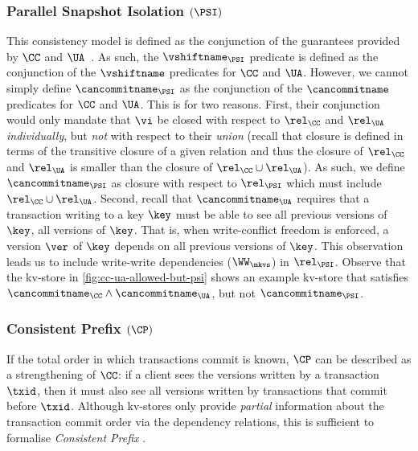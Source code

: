 \subsubsection{Parallel Snapshot Isolation \((\PSI)\)} 
This consistency model is defined as the conjunction of the guarantees provided by \(\CC\) and \(\UA\)~\cite{framework-concur}. 
As such, the \(\vshiftname_{\PSI}\) predicate is defined as the conjunction of the \(\vshiftname\) predicates for \(\CC\) and \(\UA\).
However, we cannot simply define \(\cancommitname_{\PSI}\) as the conjunction of the \(\cancommitname\) predicates for \(\CC\) and \(\UA\). 
This is for two reasons. 
First, their conjunction would only mandate that \(\vi\) be closed with respect to 
\(\rel_{\CC}\) and \(\rel_{\UA}\) \emph{individually}, but \emph{not} with respect to their \emph{union} (recall that closure is defined in terms of the transitive closure of a given relation and thus the closure of \(\rel_{\CC}\) and \(\rel_{\UA}\) is smaller than the closure of \(\rel_{\CC} \cup \rel_{\UA}\)).
As such, we define \(\cancommitname_{\PSI}\) as closure with respect to \(\rel_{\PSI}\) which must include \(\rel_{\CC} \cup \rel_{\UA}\).
Second, recall that \(\cancommitname_{\UA}\) requires that a transaction writing 
to a key \(\key\) must be able to see all previous versions of \(\key\), \ie all versions of \(\key\). 
That is, when write-conflict freedom is enforced, a version \(\ver\) of \(\key\) depends on all 
previous versions of \(\key\). 
This observation leads us to include write-write dependencies (\(\WW_{\mkvs}\)) in \(\rel_{\PSI}\). 
Observe that the kv-store in \cref{fig:cc-ua-allowed-but-psi} shows an example kv-store that satisfies \(\cancommitname_{\CC} \land \cancommitname_{\UA}\), 
but not \(\cancommitname_{\PSI}\).

\subsubsection{Consistent Prefix \((\CP)\)}
\label{para:cp}
If the total order in which transactions commit is known, \(\CP\)
can be described as a strengthening of \(\CC\): 
if a client sees the versions written by a transaction \(\txid\),
then it must also see all versions written by transactions that commit before \(\txid\). 
Although kv-stores only provide {\em partial} information about the transaction commit order via the dependency relations,
this is sufficient to formalise \emph{Consistent Prefix} \cite{laws}.

